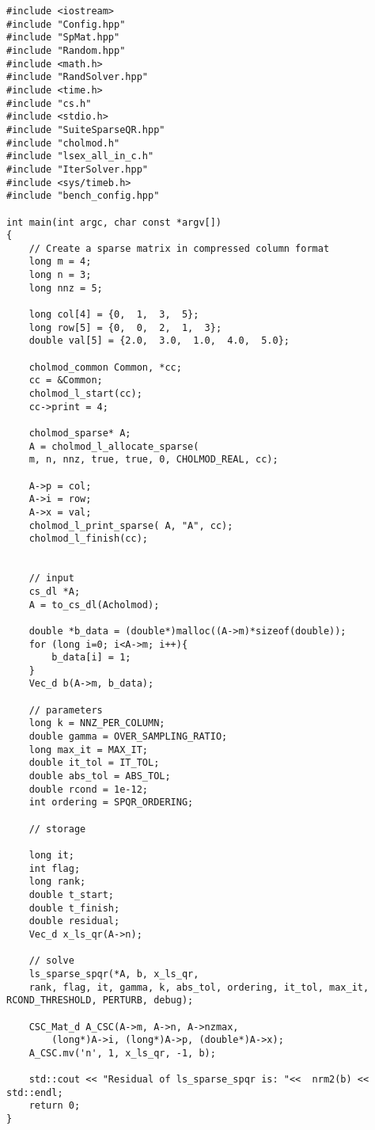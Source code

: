 \documentclass[english,11pt]{article}
\begin{document}
\begin{lstlisting}
#include <iostream>
#include "Config.hpp"
#include "SpMat.hpp"
#include "Random.hpp"
#include <math.h>
#include "RandSolver.hpp"
#include <time.h>
#include "cs.h"
#include <stdio.h> 
#include "SuiteSparseQR.hpp"
#include "cholmod.h"
#include "lsex_all_in_c.h"
#include "IterSolver.hpp"
#include <sys/timeb.h>
#include "bench_config.hpp"

int main(int argc, char const *argv[])
{
	// Create a sparse matrix in compressed column format
    long m = 4;
    long n = 3;
    long nnz = 5;

    long col[4] = {0,  1,  3,  5};
    long row[5] = {0,  0,  2,  1,  3}; 
    double val[5] = {2.0,  3.0,  1.0,  4.0,  5.0};

    cholmod_common Common, *cc;
    cc = &Common;
    cholmod_l_start(cc);
    cc->print = 4;

    cholmod_sparse* A;
    A = cholmod_l_allocate_sparse(
    m, n, nnz, true, true, 0, CHOLMOD_REAL, cc);

    A->p = col;
    A->i = row;
    A->x = val;
    cholmod_l_print_sparse( A, "A", cc);
    cholmod_l_finish(cc);


	// input
	cs_dl *A;
    A = to_cs_dl(Acholmod);

    double *b_data = (double*)malloc((A->m)*sizeof(double));
    for (long i=0; i<A->m; i++){
        b_data[i] = 1;
    }
    Vec_d b(A->m, b_data);

    // parameters
    long k = NNZ_PER_COLUMN;
    double gamma = OVER_SAMPLING_RATIO;
    long max_it = MAX_IT;
    double it_tol = IT_TOL;
    double abs_tol = ABS_TOL;
    double rcond = 1e-12;
    int ordering = SPQR_ORDERING;

    // storage

    long it;
    int flag;
    long rank;
    double t_start;
    double t_finish;
    double residual;   
    Vec_d x_ls_qr(A->n);

    // solve
    ls_sparse_spqr(*A, b, x_ls_qr, 
    rank, flag, it, gamma, k, abs_tol, ordering, it_tol, max_it, RCOND_THRESHOLD, PERTURB, debug);

    CSC_Mat_d A_CSC(A->m, A->n, A->nzmax, 
        (long*)A->i, (long*)A->p, (double*)A->x);
    A_CSC.mv('n', 1, x_ls_qr, -1, b);

    std::cout << "Residual of ls_sparse_spqr is: "<<  nrm2(b) << std::endl;
	return 0;
}
\end{lstlisting}

 

\end{document}
